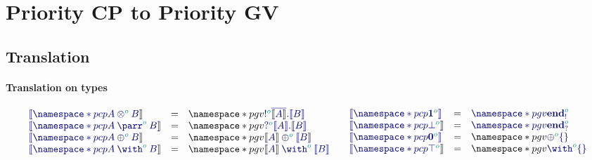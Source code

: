 \documentclass[main.tex]{subfiles}
\begin{document}
\section{Priority CP to Priority GV}

\subsection{Translation}

\paragraph{Translation on types}
\[
\begin{array}{lcl}
  \ty{\cpgv{\pcp{\tytens[\cs{o}]{A}{B}}}}
  & = & \pgv{\ty{\tysend[\cs{o}]{\co{\cpgv{A}}}{\cpgv{B}}}} \\
  \ty{\cpgv{\pcp{\typarr[\cs{o}]{A}{B}}}}
  & = & \pgv{\ty{\tyrecv[\cs{o}]{\cpgv{A}}{\cpgv{B}}}} \\
  \ty{\cpgv{\pcp{\typlus[\cs{o}]{A}{B}}}}
  & = & \pgv{\ty{\tyselect[\cs{o}]{\cpgv{A}}{\cpgv{B}}}} \\
  \ty{\cpgv{\pcp{\tywith[\cs{o}]{A}{B}}}}
  & = & \pgv{\ty{\tyoffer[\cs{o}]{\cpgv{A}}{\cpgv{B}}}}
\end{array}
\quad
\begin{array}{lcl}
  \ty{\cpgv{\pcp{\tyone[\cs{o}]}}}
  & = & \ty{\pgv{\tyends[\cs{o}]}} \\
  \ty{\cpgv{\pcp{\tybot[\cs{o}]}}}
  & = & \ty{\pgv{\tyendr[\cs{o}]}} \\
  \ty{\cpgv{\pcp{\tynil[\cs{o}]}}}
  & = & \pgv{\ty{\tyselectemp[\cs{o}]}} \\
  \ty{\cpgv{\pcp{\tytop[\cs{o}]}}}
  & = & \pgv{\ty{\tyofferemp[\cs{o}]}}
\end{array}
\]
\end{document}
